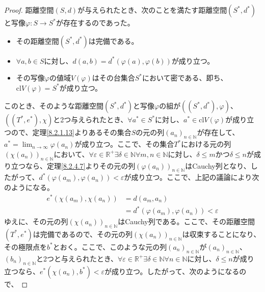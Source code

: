 \documentclass[dvipdfmx]{jsarticle}
\begin{document}
\begin{proof}
距離空間$(S,d)$が与えられたとき、次のことを満たす距離空間$\left( S^{*},d^{*} \right)$と写像$\varphi:S \rightarrow S^{*}$が存在するのであった。
\begin{itemize}
\item
  その距離空間$\left( S^{*},d^{*} \right)$は完備である。
\item
  $\forall a,b \in S$に対し、$d(a,b) = d^{*}\left( \varphi(a),\varphi(b) \right)$が成り立つ。
\item
  その写像$\varphi$の値域$V(\varphi)$はその台集合$S^{*}$において密である、即ち、${\mathrm{cl}}{V(\varphi)} = S^{*}$が成り立つ。
\end{itemize}
このとき、そのような距離空間$\left( S^{*},d^{*} \right)$と写像$\varphi$の組が$\left( \left( S^{*},d^{*} \right),\varphi \right)$、$\left( \left( T^{*},e^{*} \right),\chi \right)$と2つ与えられたとき、$\forall a^{*} \in S^{*}$に対し、$a^{*} \in {\mathrm{cl}}{V(\varphi)}$が成り立つので、定理\ref{8.2.1.13}よりあるその集合$S$の元の列$\left( a_{n} \right)_{n \in \mathbb{N}}$が存在して、$a^{*} = \lim_{n \rightarrow \infty}{\varphi\left( a_{n} \right)}$が成り立つ。ここで、その集合$T^{*}$における元の列$\left( \chi\left( a_{n} \right) \right)_{n \in \mathbb{N}}$において、$\forall\varepsilon \in \mathbb{R}^{+}\exists\delta \in \mathbb{N}\forall m,n \in \mathbb{N}$に対し、$\delta \leq m$かつ$\delta \leq n$が成り立つなら、定理\ref{8.2.4.7}よりその元の列$\left( \varphi\left( a_{n} \right) \right)_{n \in \mathbb{N}}$はCauchy列となり、したがって、$d^{*}\left( \varphi\left( a_{m} \right),\varphi\left( a_{n} \right) \right) < \varepsilon$が成り立つ。ここで、上記の議論により次のようになる。
\begin{align*}
e^{*}\left( \chi\left( a_{m} \right),\chi\left( a_{n} \right) \right) &= d\left( a_{m},a_{n} \right)\\
&= d^{*}\left( \varphi\left( a_{m} \right),\varphi\left( a_{n} \right) \right) < \varepsilon
\end{align*}
ゆえに、その元の列$\left( \chi\left( a_{n} \right) \right)_{n \in \mathbb{N}}$はCauchy列である。ここで、その距離空間$\left( T^{*},e^{*} \right)$は完備であるので、その元の列$\left( \chi\left( a_{n} \right) \right)_{n \in \mathbb{N}}$は収束することになり、その極限点を$b^{*}$とおく。ここで、このような元の列$\left( a_{n} \right)_{n \in \mathbb{N}}$が$\left( a_{n} \right)_{n \in \mathbb{N}}$、$\left( b_{n} \right)_{n \in \mathbb{N}}$と2つと与えられたとき、$\forall\varepsilon \in \mathbb{R}^{+}\exists\delta \in \mathbb{N}\forall n \in \mathbb{N}$に対し、$\delta \leq n$が成り立つなら、$e^{*}\left( \chi\left( a_{n} \right),b^{*} \right) < \varepsilon$が成り立つ。したがって、次のようになるので、

\end{proof}
\end{document}
